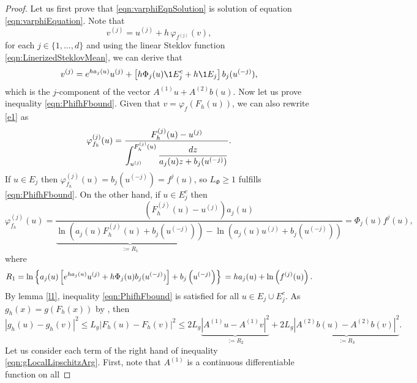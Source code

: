 \begin{proof}
	Let us first prove that \eqref{eqn:varphiEqnSolution} is solution 
	of equation \eqref{eqn:varphiEquation}.  Note that 
	\begin{equation}\label{e1}
	v^{(j)} = u^{(j)} + h \,\varphi_{f^{(j)}}(v),	
	\end{equation}
	for each $j\in \{1,\dots, d\}$ and using the linear Steklov function \eqref{eqn:LinerizedSteklovMean}, 
	we can derive that
	\begin{equation}\label{r1}
		v^{(j)}= e^{h a_j(u)} u^{(j)} + 
		\left[
			h\Phi_j(u)
			\1{E_j^c}
			+h \1{E_j}
		\right]b_{j}(u^{(-j)}),
	\end{equation}	
which is the $j$-component of the vector
$A^{(1)}u +A^{(2)} b(u)$. Now let us prove inequality \eqref{eqn:PhifhFbound}. Given that 
$v =\varphi_{f}(F_h(u))$, 
we can also rewrite \eqref{e1} as
$$
\varphi_{f_h}^{(j)}(u) = 
\frac{
	F_h^{(j)}(u)-u^{(j)}
}%
{%
	\displaystyle
	\int_{u^{(j)}}^{F_h^{(j)}(u)}
	\frac{dz}{a_j(u)z + b_j(u^{(-j)})}
}.
$$
If $u\in E_j$ then $\varphi_{f_h}^{(j)}(u) = b_j(u^{(-j)}) = f^{j}(u)$,
so $L_{\Phi}\geq 1$ fulfills  \eqref{eqn:PhifhFbound}.
On the other hand, if $u\in E_j^c$ then
\begin{equation}\label{eqn:VarPhiEjc}
\varphi_{f_h}^{(j)}(u) =
\frac{
	(F_h^{(j)}(u)-u^{(j)}) a_j(u)
}
{
	\underbrace{
		\ln \left(
		a_j(u) F_h^{(j)}(u) + b_j(u^{(-j)})
		\right)
	}_{:=R_1}
	-
	\ln \left(
	a_j(u) u^{(j)} + b_j(u^{(-j)})
	\right)
}=\Phi_j(u)f^j(u),		
\end{equation}
where
\begin{equation}\label{eqn:Ter1Simplification}	
R_1=
\ln\left\{
a_j(u)\left[
e^{ha_j(u)}u^{(j)} +
h\Phi_j(u) b_j(u^{(-j)})	
\right]
+b_j\left(u^{(-j)}\right)
\right\} \notag \\
=h a_j(u) + \ln \left( f^{(j)}(u) \right).		
\end{equation}
By lemma \ref{l1}, inequality \eqref{eqn:PhifhFbound} is satisfied 
for all $u\in E_j \cup E_j^c$. 	As $g_h(x)=g\left(F_h(x) \right)$ 
by , then
\begin{equation} \label{eqn:gLocalLipschitzArg} 
|g_h(u)-g_h(v)|^2 \leq
L_g|F_h(u)- F_h(v)|^2  \leq
2L_g \underbrace{
	|A^{(1)}u - A^{(1)}v|^2 
}_{:=R_2} +
2L_g \underbrace{
	|A^{(2)}b(u) - A^{(2)}b(v) |^2 
}_{:=R_3}.			
\end{equation}
Let us consider each term of the right hand of inequality \eqref{eqn:gLocalLipschitzArg}.
First, note that $A^{(1)}$ is a continuous differentiable function on all 

\end{proof}
